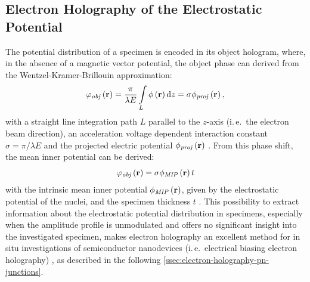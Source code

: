 \subsection{Electron Holography of the Electrostatic Potential} \label{ssec:electron-holography-electrostatic-potential}
The potential distribution of a specimen is encoded in its object hologram, where, in the absence of a magnetic vector potential, the object phase can derived from the Wentzel-Kramer-Brillouin approximation:
\begin{equation}
  \label{eq:electron-holography-electrostatic-potential}
  \varphi_{\mathit{obj}}\left(\vb{r}\right) = \frac{\pi}{\lambda E}\int\limits_{L} \phi\left(\vb{r}\right) \dd{z} = \sigma \phi_{\mathit{proj}}\left(\vb{r}\right),
\end{equation}
with a straight line integration path $L$ parallel to the $z$-axis (i.\,e.\ the electron beam direction), an acceleration voltage dependent interaction constant $\sigma = \pi / \lambda E$ and the projected electric potential $\phi_{\mathit{proj}}\left(\vb{r}\right)$ \cite{Voelkl1999,Lehmann2002,Lichte2008}. From this phase shift, the mean inner potential can be derived:
\begin{equation}
  \label{eq:electron-holography-MIP}
  \varphi_{\mathit{obj}}\left(\vb{r}\right) = \sigma \phi_{\mathit{MIP}}\left(\vb{r}\right) t
\end{equation}
with the intrinsic mean inner potential $\phi_{\mathit{MIP}}\left(\vb{r}\right)$, given by the electrostatic potential of the nuclei, and the specimen thickness $t$ \cite{Voelkl1999,Lehmann2002,Lichte2008}. This possibility to extract information about the electrostatic potential distribution in specimens, especially when the amplitude profile is unmodulated and offers no significant insight into the investigated specimen, makes electron holography an excellent method for in situ investigations of semiconductor nanodevices (i.\,e.\ electrical biasing electron holography) \cite{Tonomura1987,Lehmann2002,Lichte2008}, as described in the following \cref{ssec:electron-holography-pn-junctions}.
